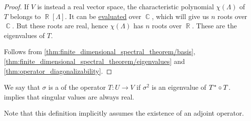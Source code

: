 \begin{proof}
   If \( V \) is instead a real vector space, the characteristic polynomial \( \chi(\Lambda) \) of \( T \) belongs to \( \BbbR[\Lambda] \). It can be \hyperref[thm:polynomial_algebra_universal_property]{evaluated} over \( \BbbC \), which will give us \( n \) roots over \( \BbbC \). But these roots are real, hence \( \chi(\Lambda) \) has \( n \) roots over \( \BbbR \). These are the eigenvalues of \( T \).

   Follows from \cref{thm:finite_dimensional_spectral_theorem/basis}, \cref{thm:finite_dimensional_spectral_theorem/eigenvalues} and \cref{thm:operator_diagonalizability}.
\end{proof}

\begin{definition}\label{def:singular_value}
  We say that \( \sigma \) is a  of the operator \( T: U \to V \) if \( \sigma^2 \) is an eigenvalue of \( T^* \bincirc T \).  implies that singular values are always real.

  Note that this definition implicitly assumes the existence of an adjoint operator.
\end{definition}

